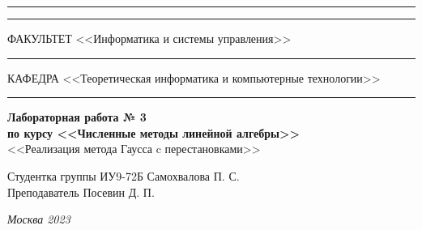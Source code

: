 \documentclass[a4paper, 14pt]{extarticle}
\begin{document}
\begin{titlepage}
\vspace{-25pt}
\hspace{-35pt}\rule{\textwidth}{2.3pt}

\vspace*{-20.3pt}
\hspace{-35pt}\rule{\textwidth}{0.4pt}

\vspace{1.5ex}
\hspace{-35pt} \noindent \small ФАКУЛЬТЕТ\hspace{80pt} <<Информатика и системы управления>>

\vspace*{-16pt}
\hspace{47pt}\rule{0.83\textwidth}{0.4pt}

\vspace{0.5ex}
\hspace{-35pt} \noindent \small КАФЕДРА\hspace{50pt} <<Теоретическая информатика и компьютерные технологии>>

\vspace*{-16pt}
\hspace{30pt}\rule{0.866\textwidth}{0.4pt}
  
\vspace{11em}

\begin{center}
\Large {\bf Лабораторная работа № 3} \\
\large {\bf по курсу <<Численные методы линейной алгебры>>} \\
\large <<Реализация метода Гаусса c перестановками>>
\end{center}\normalsize

\vspace{8em}


\begin{flushright}
  {Студентка группы ИУ9-72Б Самохвалова П. С. \hspace*{15pt}\\
  \vspace{2ex}
  Преподаватель Посевин Д. П.\hspace*{15pt}}
\end{flushright}

\bigskip

\vfill
 

\begin{center}
\textsl{Москва 2023}
\end{center}
\end{titlepage}
\end{document}
